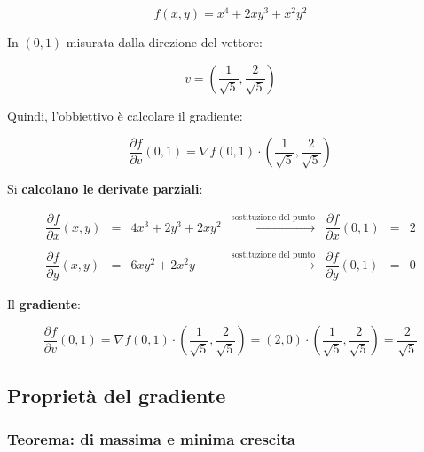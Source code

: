 \documentclass[a4paper]{article}
\begin{document}
	\begin{equation*}
		f\left(x,y\right) = x^{4} + 2xy^{3} + x^{2}y^{2}
	\end{equation*}

	\noindent
	In $\left(0,1\right)$ misurata dalla direzione del vettore:
	
	\begin{equation*}
		v = \left(\dfrac{1}{\sqrt{5}}, \dfrac{2}{\sqrt{5}}\right)
	\end{equation*}

	\noindent
	Quindi, l'obbiettivo è calcolare il gradiente:
	
	\begin{equation*}
		\dfrac{\partial f}{\partial v}\left(0,1\right) = \nabla f\left(0,1\right) \cdot \left(\dfrac{1}{\sqrt{5}}, \dfrac{2}{\sqrt{5}}\right)
	\end{equation*}

	\noindent
	Si \textbf{calcolano le derivate parziali}:
	
	\begin{equation*}
		\begin{array}{lllllll}
			\dfrac{\partial f}{\partial x}\left(x,y\right) & = & 4x^{3} + 2y^{3} + 2xy^{2} & \xrightarrow{\text{sostituzione del punto}} & \dfrac{\partial f}{\partial x}\left(0,1\right) & = & 2 \\
			&&&&&& \\
			\dfrac{\partial f}{\partial y}\left(x,y\right) & = & 6xy^{2} + 2x^{2}y 		   & \xrightarrow{\text{sostituzione del punto}} & \dfrac{\partial f}{\partial y}\left(0,1\right) & = & 0
		\end{array}
	\end{equation*}

	\noindent
	Il \textbf{gradiente}:
	
	\begin{equation*}
		\dfrac{\partial f}{\partial v}\left(0,1\right) = \nabla f\left(0,1\right) \cdot \left(\dfrac{1}{\sqrt{5}}, \dfrac{2}{\sqrt{5}}\right) = \left(2,0\right) \cdot \left(\dfrac{1}{\sqrt{5}}, \dfrac{2}{\sqrt{5}}\right) = \dfrac{2}{\sqrt{5}}
	\end{equation*}

	\newpage
	
	\subsection{Proprietà del gradiente}
	
	\subsubsection{Teorema: di massima e minima crescita}
	
\end{document}

